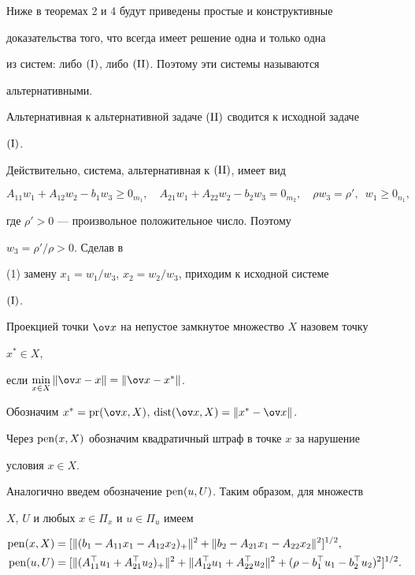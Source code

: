 Ниже в теоремах 2 и 4 будут приведены простые и конструктивные


доказательства того, что всегда имеет решение одна и только одна


из систем: либо $(\mathrm I)$, либо $(\mathrm{II})$. Поэтому эти системы называются


альтернативными.





Альтернативная к альтернативной задаче $(\mathrm{II})$ сводится к исходной задаче 


$(\mathrm I)$.


Действительно, система, альтернативная к $(\mathrm{II})$, имеет вид


\begin{equation}


A_{11}w_1+A_{12}w_2-b_1w_3\ge0_{m_1},\quad


A_{21}w_1+A_{22}w_2-b_2w_3=0_{m_2},\quad


\rho w_3=\rho',\ \; w_1\ge0_{n_1},


\end{equation}


где $\rho'>0$ --- произвольное положительное число. Поэтому 


$w_3=\rho'/\rho>0$. Сделав в


(1) замену $x_1=w_1/w_3$, $x_2=w_2/w_3$, приходим к исходной системе 


$(\mathrm I)$.





Проекцией точки $\ov x$ на непустое замкнутое множество $X$ назовем точку 


$x^*\in X$,


если $\min\limits_{x\in X}\|\ov x-x\|=\|\ov x-x^*\|$.


Обозначим $x^*=\pr(\ov x,X)$, $\dist(\ov x,X)=\|x^*-\ov x\|$.





Через $\operatorname{pen}(x,X)$ обозначим квадратичный штраф в точке $x$ за нарушение 


условия $x\in X$.


Аналогично введем обозначение $\operatorname{pen}(u,U)$. Таким образом, для множеств


$X$, $U$ и любых $x\in \Pi_x$ и $u\in\Pi_u$ имеем


\begin{align*}


\pen(x,X)&=[\|(b_1-A_{11}x_1-A_{12}x_2)_+\|^2+


\|b_2-A_{21}x_1-A_{22}x_2\|^2]^{1/2},\\


%


\pen(u,U)&=[\|(A^\top_{11}u_1+A^\top_{21}u_2)_+\|^2+


\|A^\top_{12}u_1+A^\top_{22}u_2\|^2+


(\rho-b^\top_1u_1-b^\top_2u_2)^2]^{1/2}.


\end{align*}


